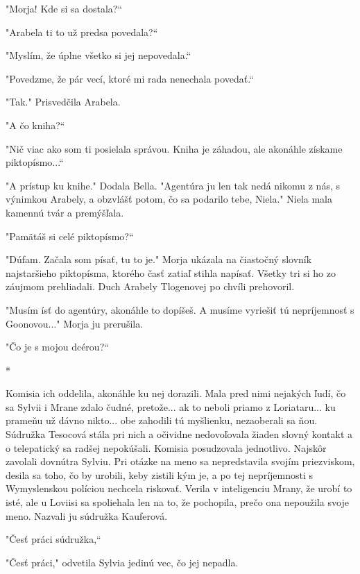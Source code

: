 \documentclass{book}
\begin{document}
"$ $Morja! Kde si sa dostala?“

"$ $Arabela ti to už predsa povedala?“

"$ $Myslím, že úplne všetko si jej nepovedala.“

"$ $Povedzme, že pár vecí, ktoré mi rada nenechala povedať.“

"$ $Tak."$ $ Prisvedčila Arabela.

"$ $A čo kniha?“

"$ $Nič viac ako som ti posielala správou. Kniha je záhadou, ale akonáhle získame piktopísmo...“

"$ $A prístup ku knihe."$ $ Dodala Bella. "$ $Agentúra ju len tak nedá nikomu z nás, s výnimkou Arabely, a obzvlášť potom, čo sa podarilo tebe, Niela."$ $ Niela mala kamennú tvár a premýšľala.

"$ $Pamätáš si celé piktopísmo?“

"$ $Dúfam. Začala som písať, tu to je."$ $ Morja ukázala na čiastočný slovník najstaršieho piktopísma, ktorého časť zatiaľ stihla napísať. Všetky tri si ho zo záujmom prehliadali. Duch Arabely Tlogenovej po chvíli prehovoril.

"$ $Musím ísť do agentúry, akonáhle to dopíšeš. A musíme vyriešiť tú nepríjemnosť s Goonovou..."$ $ Morja ju prerušila.

"$ $Čo je s mojou dcérou?“

\begin{center}

*

\end{center}

Komisia ich oddelila, akonáhle ku nej dorazili. Mala pred nimi nejakých ľudí, čo sa Sylvii i Mrane zdalo čudné, pretože... ak to neboli priamo z Loriataru... ku prameňu už dávno nikto... obe zahodili tú myšlienku, nezaoberali sa ňou. Súdružka Tesocová stála pri nich a očividne nedovoľovala žiaden slovný kontakt a o telepatický sa radšej nepokúšali. Komisia posudzovala jednotlivo. Najskôr zavolali dovnútra Sylviu. Pri otázke na meno sa nepredstavila svojím priezviskom, desila sa toho, čo by urobili, keby zistili kým je, a po tej nepríjemnosti s Wymyslenskou políciou nechcela riskovať. Verila v inteligenciu Mrany, že urobí to isté, ale u Loviisi sa spoliehala len na to, že pochopila, prečo ona nepoužila svoje meno. Nazvali ju súdružka Kauferová.

"$ $Česť práci súdružka,“

"$ $Česť práci,"$ $ odvetila Sylvia jedinú vec, čo jej nepadla.
\end{document}
